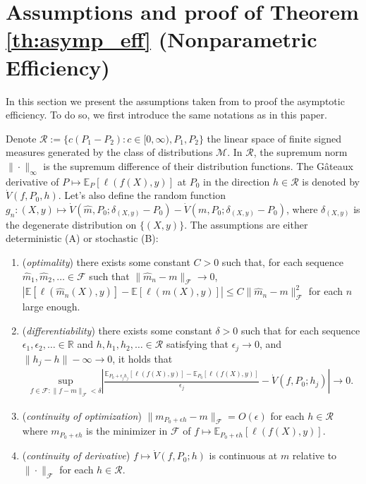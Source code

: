\documentclass{article}
\theoremstyle{plain}
\theoremstyle{definition}
\theoremstyle{remark}
\newcommand{\e}[1]{\mathbb{E}\left[#1\right]  } %
\begin{document}
\section{Assumptions and proof of Theorem \ref{th:asymp_eff} (Nonparametric Efficiency)}\label{sect:proofTheo}

In this section we present the assumptions taken from \citet{williamson2023general} to proof the asymptotic efficiency. To do so, we first introduce the same notations as in this paper. 

Denote $\mathcal{R}:=\{c(P_1-P_2):c\in [0, \infty), P_1, P_2\}$ the linear space of finite signed measures generated by the class of distributions $\mathcal{M}$. In $\mathcal{R}$, the supremum norm $\|\cdot\|_\infty$ is the supremum difference of their distribution functions. The Gâteaux derivative of $P\mapsto\mathbb{E}_P\left[\ell(f(X), y)\right]$ at $P_0$ in the direction $h\in \mathcal{R}$ is denoted by $\dot{V}(f, P_0, h)$. Let's also define the random function $g_n:(X,y)\mapsto \dot{V}(\widehat{m}, P_0; \delta_{(X,y)}-P_0)-\dot{V}(m, P_0;\delta_{(X,y)}-P_0)$, where $\delta_{(X,y)}$ is the degenerate distribution on $\{(X,y)\}$. The assumptions are either deterministic (A) or stochastic (B):

\begin{enumerate}[label=A\arabic*]
    \item (\textit{optimality}) there exists some constant $C>0$ such that, for each sequence $\widehat{m}_1, \widehat{m}_2, \ldots\in \mathcal{F}$ such that $\|\widehat{m}_n-m\|_\mathcal{F}\to 0$, $|\e{\ell(\widehat{m}_n(X), y)}-\e{\ell(m(X), y)}|\leq C\|\widehat{m}_n-m\|^2_\mathcal{F}$ for each $n$ large enough.
    \item (\textit{differentiability}) there exists some constant $\delta>0$ such that for each sequence $\epsilon_1, \epsilon_2, \ldots\in \mathbb{R}$ and $h, h_1, h_2, \ldots\in \mathcal{R}$ satisfying that $\epsilon_j\to 0$, and $\|h_j-h\|-\infty\to 0$, it holds that 
    \begin{align*}
        \underset{f\in\mathcal{F}:\|f-m\|_\mathcal{F}<\delta}{\mathrm{sup}}\left|\frac{\mathbb{E}_{P_0+\epsilon_jh_j}\left[\ell(f(X), y)\right]-\mathbb{E}_{P_0}\left[\ell(f(X), y)\right]}{\epsilon_j}-\dot{V}(f, P_0; h_j)\right|\to 0.
    \end{align*}
    \item (\textit{continuity of optimization}) $\|m_{P_0+\epsilon h}-m\|_\mathcal{F}=O(\epsilon)$ for each $h\in \mathcal{R}$ where $m_{P_0+\epsilon h}$ is the minimizer in $\mathcal{F}$ of $f\mapsto \mathbb{E}_{P_0+\epsilon h}[\ell(f(X), y)]$.
    \item (\textit{continuity of derivative}) $f\mapsto \dot{V}(f, P_0; h)$ is continuous at $m$ relative to $\|\cdot\|_\mathcal{F}$ for each $h\in \mathcal{R}$.
\end{enumerate}
\end{document}

